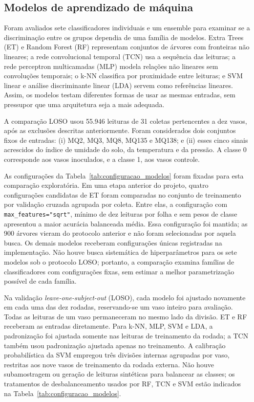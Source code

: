 \subsection{Modelos de aprendizado de máquina}
\label{subsec:modelos}

Foram avaliados sete classificadores individuais e um ensemble para examinar
se a discriminação entre os grupos dependia de uma família de modelos. Extra
Trees (ET) e Random Forest (RF) representam conjuntos de árvores com
fronteiras não lineares; a rede convolucional temporal (TCN) usa a sequência
das leituras; a rede perceptron multicamadas (MLP) modela relações não
lineares sem convoluções temporais; o k-NN classifica por proximidade entre
leituras; e SVM linear e análise discriminante linear (LDA) servem como
referências lineares. Assim, os modelos testam diferentes formas de usar as
mesmas entradas, sem pressupor que uma arquitetura seja a mais adequada.

A comparação LOSO usou 55.946 leituras de 31 coletas pertencentes a dez
vasos, após as exclusões descritas anteriormente. Foram considerados dois
conjuntos fixos de entradas: (i) MQ2, MQ3, MQ8, MQ135 e MQ138; e (ii) esses
cinco sinais acrescidos do índice de umidade do solo, da temperatura e da
pressão. A classe 0 corresponde aos vasos inoculados, e a classe 1, aos
vasos controle.

As configurações da Tabela~\ref{tab:configuracao_modelos} foram fixadas para
esta comparação exploratória. Em uma etapa anterior do projeto, quatro
configurações candidatas de ET foram comparadas no conjunto de treinamento
por validação cruzada agrupada por coleta. Entre elas, a configuração com
\texttt{max\_features="sqrt"}, mínimo de dez leituras por folha e sem pesos
de classe apresentou a maior acurácia balanceada média. Essa configuração
foi mantida; as 900 árvores vieram do protocolo anterior e não foram
selecionadas por aquela busca. Os demais modelos receberam configurações
únicas registradas na implementação. Não houve busca sistemática de
hiperparâmetros para os sete modelos sob o protocolo LOSO; portanto, a
comparação examina famílias de classificadores com configurações fixas,
sem estimar a melhor parametrização possível de cada família.

Na validação \textit{leave-one-subject-out} (LOSO), cada modelo foi ajustado
novamente em cada uma das dez rodadas, reservando-se um vaso inteiro para
avaliação. Todas as leituras de um vaso permaneceram no mesmo lado da divisão.
ET e RF receberam as entradas diretamente. Para k-NN, MLP, SVM e LDA, a
padronização foi ajustada somente nas leituras de treinamento da rodada;
a TCN também usou padronização ajustada apenas no treinamento. A calibração
probabilística da SVM empregou três divisões internas agrupadas por vaso,
restritas aos nove vasos de treinamento da rodada externa. Não houve
subamostragem ou geração de leituras sintéticas para balancear as classes;
os tratamentos de desbalanceamento usados por RF, TCN e SVM estão indicados
na Tabela~\ref{tab:configuracao_modelos}.

